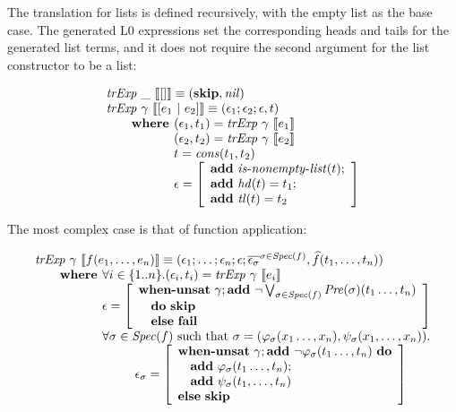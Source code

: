 The translation for lists is defined recursively, with the empty list 
as the base case. The generated L0 expressions set the corresponding heads and tails 
for the generated list terms, and it does not require the second
argument for the list constructor to be a list:

\[
\begin{array}{l}
\trExp{\_}{[]} \equiv (
  \skipE, \mathit{nil}
)\\
\trExp{\gamma}{[e_1~|~e_2]} \equiv (\epsilon_1;\epsilon_2;\epsilon, t)\\
  \qquad \textbf{where } (\epsilon_1, t_1) = \trExp{\gamma}{e_1}\\ 
  \qquad \phantom{\textbf{where }} (\epsilon_2, t_2) = \trExp{\gamma}{e_2}\\ 
  \qquad \phantom{\textbf{where }} t = \mathit{cons}(t_1, t_2)\\ 
  \qquad \phantom{\textbf{where }} \epsilon = \left[
    \begin{array}{l}
      \addE~\isnelist{t};\\
      \addE~\mathit{hd}(t) = t_1;\\
      \addE~\mathit{tl}(t) = t_2\\
    \end{array}
  \right]
\end{array}
\]

The most complex case is that of function application:

\[
\begin{array}{l}
\trExp{\gamma}{f(e_1, \ldots, e_n)} \equiv (\epsilon_1; \dots; \epsilon_n; \epsilon; \overline{\epsilon_\sigma}^{\sigma \in \Spec{f}}, \widehat{f}(t_1, \ldots, t_n))\\
\qquad \textbf{where } \forall i \in \{1..n\}. (\epsilon_i, t_i) = \trExp{\gamma}{e_i}\\
\qquad \phantom{\textbf{where }} \epsilon = \left[ 
  \begin{array}{l}
  \whenUnsatW~\gamma;\addE~\neg \bigvee_{\sigma \in \Spec{f}}\Pre{\sigma}(t_1\ldots,t_n)\\
  \quad\doW~\skipE\\
  \quad\elseW~\failE\\
  \end{array}
  \right]\\
\qquad \phantom{\textbf{where }} \forall \sigma \in \Spec{f} \textrm{ such that } \sigma = (\varphi_\sigma(x_1\ldots,x_n), \psi_\sigma(x_1, \ldots, x_n)).\\
\qquad\qquad\qquad\qquad \epsilon_\sigma = \left[ 
\begin{array}{l}
\whenUnsatW~\gamma;\addE~\neg \varphi_\sigma(t_1\ldots,t_n)~\doW\\
\quad\addE~\varphi_\sigma(t_1\ldots,t_n);\\
\quad\addE~\psi_\sigma(t_1,\ldots,t_n)\\
\elseW~\skipE\\
\end{array}
\right] \\
\end{array}
\]

